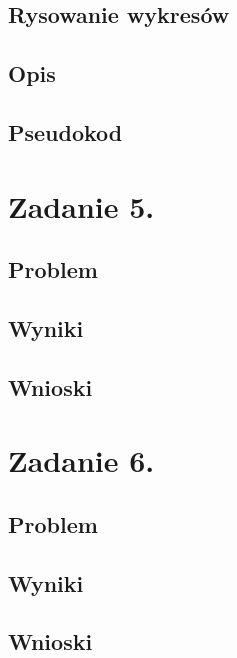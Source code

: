 \documentclass[11pt, a4paper]{article}
\begin{document}
    \subsection{Rysowanie wykresów}
    \subsection{Opis}
    \subsection{Pseudokod}
    \section{Zadanie 5.}
    \subsection{Problem}
    \subsection{Wyniki}
    \subsection{Wnioski}
    \section{Zadanie 6.}
    \subsection{Problem}
    \subsection{Wyniki}
    \subsection{Wnioski}
\end{document}
